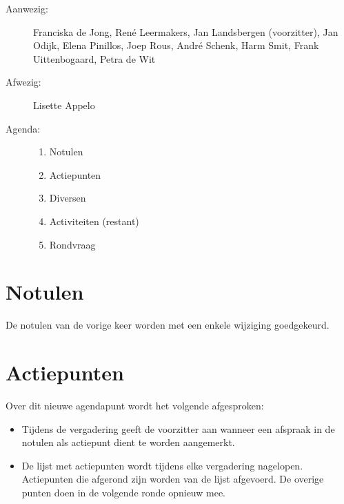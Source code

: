

   \RosSupersedes{-}
   \MakeRosTitle
%
%
\begin{description}
\item[Aanwezig:] Franciska de Jong, Ren\'{e} Leermakers,  
                 Jan Landsbergen (voorzitter),   
                 Jan Odijk, Elena Pinillos, 
                 Joep Rous, Andr\'{e} Schenk,
                 Harm Smit,
                 Frank Uittenbogaard, Petra de Wit
                  
                  

\item[Afwezig:]  Lisette Appelo
\item[Agenda:]\mbox{}
  \begin{enumerate}
  \item Notulen
  \item Actiepunten
  \item Diversen
  \item Activiteiten (restant)
  \item Rondvraag
  \end{enumerate}
\end{description}

\section{Notulen}
De notulen van de vorige keer worden met een enkele wijziging goedgekeurd.

\section{Actiepunten}

Over dit nieuwe agendapunt wordt het volgende afgesproken:
\begin{itemize}
  \item Tijdens de vergadering geeft de voorzitter aan wanneer een afspraak
 in de notulen als actiepunt dient te worden aangemerkt. 
  \item De lijst met actiepunten wordt tijdens elke vergadering nagelopen.
 Actiepunten die afgerond zijn worden van de lijst 
afgevoerd. De overige punten doen in de volgende ronde opnieuw mee. 
\end{itemize}

